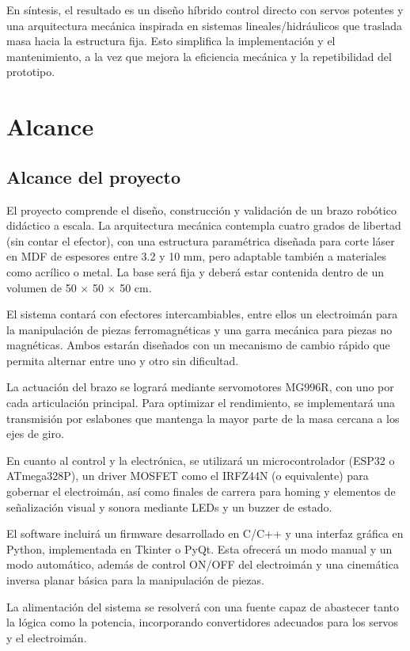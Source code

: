 En síntesis, el resultado es un diseño híbrido control directo con servos potentes y una arquitectura mecánica inspirada en sistemas lineales/hidráulicos que traslada masa hacia la estructura fija. 
Esto simplifica la implementación y el mantenimiento, a la vez que mejora la eficiencia mecánica y la repetibilidad del prototipo.

\newpage

\section{Alcance}

\subsection{Alcance del proyecto}
El proyecto comprende el diseño, construcción y validación de un brazo robótico didáctico a escala. La arquitectura mecánica contempla cuatro grados de libertad (sin contar el efector), con una estructura paramétrica diseñada para corte láser en MDF de espesores entre 3.2 y 10 mm, pero adaptable también a materiales como acrílico o metal. La base será fija y deberá estar contenida dentro de un volumen de 50 $\times$ 50 $\times$ 50 cm.

El sistema contará con efectores intercambiables, entre ellos un electroimán para la manipulación de piezas ferromagnéticas y una garra mecánica para piezas no magnéticas. Ambos estarán diseñados con un mecanismo de cambio rápido que permita alternar entre uno y otro sin dificultad.

La actuación del brazo se logrará mediante servomotores MG996R, con uno por cada articulación principal. Para optimizar el rendimiento, se implementará una transmisión por eslabones que mantenga la mayor parte de la masa cercana a los ejes de giro.

En cuanto al control y la electrónica, se utilizará un microcontrolador (ESP32 o ATmega328P), un driver MOSFET como el IRFZ44N (o equivalente) para gobernar el electroimán, así como finales de carrera para homing y elementos de señalización visual y sonora mediante LEDs y un buzzer de estado.

El software incluirá un firmware desarrollado en C/C++ y una interfaz gráfica en Python, implementada en Tkinter o PyQt. Esta ofrecerá un modo manual y un modo automático, además de control ON/OFF del electroimán y una cinemática inversa planar básica para la manipulación de piezas.

La alimentación del sistema se resolverá con una fuente capaz de abastecer tanto la lógica como la potencia, incorporando convertidores adecuados para los servos y el electroimán.

